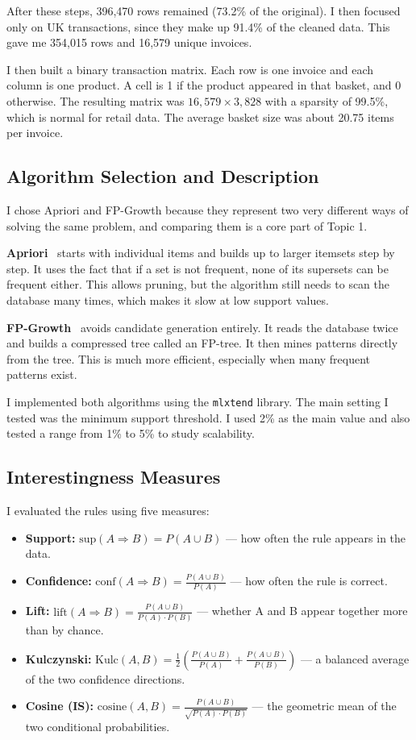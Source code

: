 \documentclass[conference]{IEEEtran}
\begin{document}
After these steps, 396,470 rows remained (73.2\% of the original). I then focused only on UK transactions, since they make up 91.4\% of the cleaned data. This gave me 354,015 rows and 16,579 unique invoices.

I then built a binary transaction matrix. Each row is one invoice and each column is one product. A cell is 1 if the product appeared in that basket, and 0 otherwise. The resulting matrix was $16,579 \times 3,828$ with a sparsity of 99.5\%, which is normal for retail data. The average basket size was about 20.75 items per invoice.

\subsection{Algorithm Selection and Description}

I chose Apriori and FP-Growth because they represent two very different ways of solving the same problem, and comparing them is a core part of Topic 1.

\textbf{Apriori}~\cite{b1} starts with individual items and builds up to larger itemsets step by step. It uses the fact that if a set is not frequent, none of its supersets can be frequent either. This allows pruning, but the algorithm still needs to scan the database many times, which makes it slow at low support values.

\textbf{FP-Growth}~\cite{b2} avoids candidate generation entirely. It reads the database twice and builds a compressed tree called an FP-tree. It then mines patterns directly from the tree. This is much more efficient, especially when many frequent patterns exist.

I implemented both algorithms using the \texttt{mlxtend} library. The main setting I tested was the minimum support threshold. I used 2\% as the main value and also tested a range from 1\% to 5\% to study scalability.

\subsection{Interestingness Measures}

I evaluated the rules using five measures:

\begin{itemize}
    \item \textbf{Support:} $\text{sup}(A \Rightarrow B) = P(A \cup B)$ — how often the rule appears in the data.
    \item \textbf{Confidence:} $\text{conf}(A \Rightarrow B) = \frac{P(A \cup B)}{P(A)}$ — how often the rule is correct.
    \item \textbf{Lift:} $\text{lift}(A \Rightarrow B) = \frac{P(A \cup B)}{P(A) \cdot P(B)}$ — whether A and B appear together more than by chance.
    \item \textbf{Kulczynski:} $\text{Kulc}(A,B) = \frac{1}{2}\left(\frac{P(A \cup B)}{P(A)} + \frac{P(A \cup B)}{P(B)}\right)$ — a balanced average of the two confidence directions.
    \item \textbf{Cosine (IS):} $\text{cosine}(A,B) = \frac{P(A \cup B)}{\sqrt{P(A) \cdot P(B)}}$ — the geometric mean of the two conditional probabilities.
\end{itemize}
\end{document}
